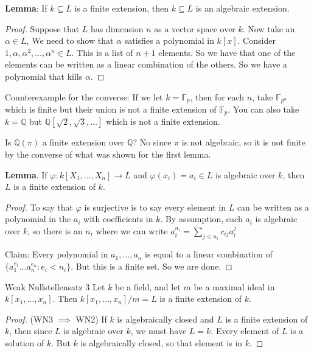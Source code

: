 \documentclass{report}
\begin{document}
\textbf{Lemma}: If $k \subseteq L$ is a finite extension, then $k \subseteq L$ is an algebraic extension.
    \begin{proof}
        Suppose that $L$ has dimension $n$ as a vector space over $k$. Now take an $\alpha \in L$, We need to show that $\alpha$ satisfies a polynomial in $k[x]$. Consider $1, \alpha, \alpha^{2}, \ldots, \alpha^{n} \in L$. This is a list of $n + 1$ elements. So we have that one of the elements can be written as a linear combination of the others. So we have a polynomial that kills $\alpha$.
    \end{proof}

Counterexample for the converse: If we let $k = \mathbb{F}_{p}$, then for each $n$, take $\mathbb{F}_{p^{n}}$ which is finite but their union is not a finite extension of $\mathbb{F}_{p}$. You can also take $k = \mathbb{Q}$ but $\mathbb{Q}[\sqrt{2}, \sqrt{3}, \ldots]$ which is not a finite extension.

Is $\mathbb{Q}(\pi)$ a finite extension over $\mathbb{Q}$? No since $\pi$ is not algebraic, so it is not finite by the converse of what was shown for the first lemma.

\textbf{Lemma}. If $\varphi : k[X_{1}, \ldots, X_{n}] \rightarrow L$ and $\varphi(x_{i}) = a_{i} \in L$ is algebraic over $k$, then $L$ is a finite extension of $k$.
    \begin{proof}
        To say that $\varphi$ is surjective is to say every element in $L$ can be written as a polynomial in the $a_{i}$ with coefficients in $k$. By assumption, each $a_{i}$ is algebraic over $k$, so there is an $n_{i}$ where we can write $a_{i}^{n_{i}} = \sum_{j \leq n_{i}}^{} c_{ij}a_{i}^{j}$

        Claim: Every polynomial in $a_{1}, \ldots, a_{n}$ is equal to a linear combination of $\{a_{1}^{e_{1}} \ldots a_{n}^{e_{n}} : e_{i} < n_{i}\}$. But this is a finite set. So we are done. 
    \end{proof}

\begin{theorem}{Weak Nullstellensatz 3}
    Let $k$ be a field, and let $m$ be a maximal ideal in $k[x_{1}, \ldots, x_{n}]$. Then $k[x_{1}, \ldots, x_{n}]/m = L$ is a finite extension of $k$.
\end{theorem}

\begin{proof}
    (WN3 $\implies$ WN2) If $k$ is algebraically closed and $L$ is a finite extension of $k$, then since $L$ is algebraic over $k$, we must have $L = k$. Every element of $L$ is a solution of $k$. But $k$ is algebraically closed, so that element is in $k$.
\end{proof}
\end{document}

